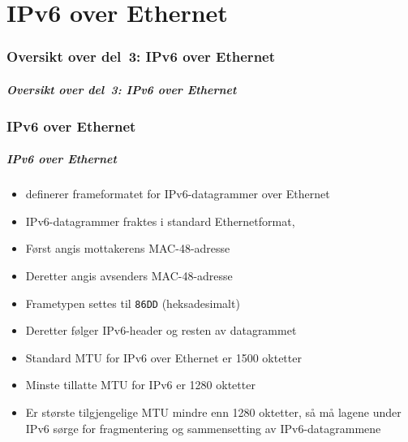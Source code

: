 \part{IPv6 over Ethernet}

\begin{frame}
  \partpage
\end{frame}

\section*{Oversikt over del~3: IPv6 over Ethernet}
\begin{frame}[allowframebreaks]
  \frametitle{Oversikt over del~3: IPv6 over Ethernet}
    \tableofcontents%
\end{frame}

\section{IPv6 over Ethernet}
\begin{frame}%
  \frametitle{IPv6 over Ethernet}
  \pause
  \begin{itemize}[<+->]
  \item {} definerer frameformatet for IPv6-datagrammer over
    Ethernet
  \item IPv6-datagrammer fraktes i standard Ethernetformat, 
  \item Først angis mottakerens MAC-48-adresse
  \item Deretter angis avsenders MAC-48-adresse
  \item Frametypen settes til \texttt{86DD} (heksadesimalt)
  \item Deretter følger IPv6-header og resten av datagrammet
  \item Standard MTU for IPv6 over Ethernet er 1500 oktetter
  \item Minste tillatte MTU for IPv6 er 1280 oktetter
  \item Er største tilgjengelige MTU mindre enn 1280 oktetter, så må
    lagene under IPv6 sørge for fragmentering og sammensetting av
    IPv6-datagrammene 
  \end{itemize}
\end{frame}


